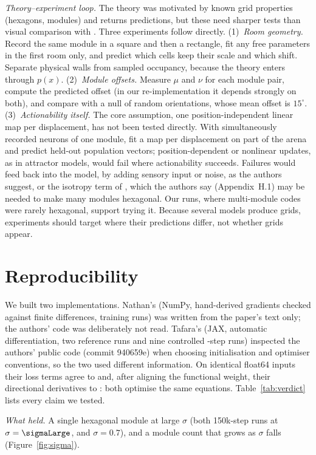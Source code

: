 \documentclass[10pt,letterpaper]{article}
\begin{document}
\emph{Theory--experiment loop.} The theory was motivated by known grid properties (hexagons, modules) and returns predictions, but these need sharper tests than visual comparison with \citet{stensola2012}. Three experiments follow directly. (1)~\emph{Room geometry.} Record the same module in a square and then a rectangle, fit any free parameters in the first room only, and predict which cells keep their scale and which shift. Separate physical walls from sampled occupancy, because the theory enters through $p(x)$. (2)~\emph{Module offsets.} Measure $\mu$ and $\nu$ for each module pair, compute the predicted offset (in our re-implementation it depends strongly on both), and compare with a null of random orientations, whose mean offset is $15^\circ$. (3)~\emph{Actionability itself.} The core assumption, one position-independent linear map per displacement, has not been tested directly. With simultaneously recorded neurons of one module, fit a map per displacement on part of the arena and predict held-out population vectors; position-dependent or nonlinear updates, as in attractor models, would fail where actionability succeeds. Failures would feed back into the model, by adding sensory input or noise, as the authors suggest, or the isotropy term of \citet{gao2021}, which the authors say (Appendix~H.1) may be needed to make many modules hexagonal. Our runs, where multi-module codes were rarely hexagonal, support trying it. Because several models produce grids, experiments should target where their predictions differ, not whether grids appear.

\section{Reproducibility}
We built two implementations. Nathan's (NumPy, hand-derived gradients checked against finite differences, \nJobs{} training runs) was written from the paper's text only; the authors' code was deliberately not read. Tafara's (JAX, automatic differentiation, two reference runs and nine controlled \jDiagSteps-step runs) inspected the authors' public code (commit 940659e) when choosing initialisation and optimiser conventions, so the two used different information. On identical float64 inputs their loss terms agree to \auditLoss{} and, after aligning the functional weight, their directional derivatives to \auditGrad{}: both optimise the same equations. Table~\ref{tab:verdict} lists every claim we tested.

\emph{What held.} A single hexagonal module at large $\sigma$ (both 150k-step runs at $\sigma=\sigmaLarge$, and $\sigma=0.7$), and a module count that grows as $\sigma$ falls (Figure~\ref{fig:sigma}).
\end{document}
